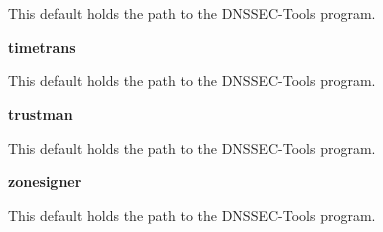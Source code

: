 \begin{description}
This default holds the path to the DNSSEC-Tools  program.

\item {\bf timetrans}\verb" "

This default holds the path to the DNSSEC-Tools  program.

\item {\bf trustman}\verb" "

This default holds the path to the DNSSEC-Tools  program.

\item {\bf zonesigner}\verb" "

This default holds the path to the DNSSEC-Tools  program.

\end{description}

